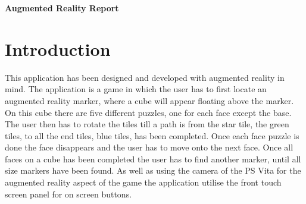 \begingroup
\begin{center}
	\Large\bf{Augmented Reality Report}
	\end{center}
\endgroup

\section{Introduction}\label{sc:Intro}
This application has been designed and developed with augmented reality in mind.
The application is a game in which the user has to first locate an augmented reality marker, where a cube will appear floating above the marker.
On this cube there are five different puzzles, one for each face except the base.
The user then has to rotate the tiles till a path is from the star tile, the green tiles, to all the end tiles, blue tiles, has been completed.
Once each face puzzle is done the face disappears and the user has to move onto the next face. Once all faces on a cube has been completed the user has to find another marker, until all size markers have been found.
As well as using the camera of the PS Vita for the augmented reality aspect of the game the application utilise the front touch screen panel for on screen buttons. 
